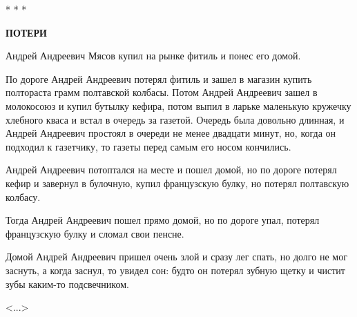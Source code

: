 \begin{center}
    * * *
\end{center}

\begin{center}
    \textbf{ПОТЕРИ}
\end{center}

    Андрей  Андреевич  Мясов купил на  рынке
фитиль и понес его домой.

    По дороге Андрей Андреевич  потерял  
фитиль  и  зашел  в  магазин купить полтораста
грамм полтавской колбасы. Потом Андрей  
Андреевич зашел  в  молокосоюз  и купил бутылку
кефира, потом выпил в ларьке  маленькую 
кружечку хлебного  кваса  и встал  в очередь за
газетой.  Очередь была довольно  длинная,  и
Андрей Андреевич простоял в очереди не менее
двадцати минут, но, когда он  подходил к 
газетчику,  то  газеты перед самым  его  носом
кончились.

    Андрей  Андреевич  потоптался на месте и
пошел домой,  но по дороге потерял  кефир  и
завернул в булочную, купил французскую  
булку, но потерял полтавскую колбасу.

    Тогда  Андрей Андреевич пошел прямо  
домой, но по дороге упал, потерял  французскую
булку и сломал свои пенсне.

    Домой Андрей Андреевич пришел очень злой
и сразу лег спать,  но долго не мог заснуть,
а когда заснул, то увидел сон: будто он  
потерял  зубную  щетку и чистит  зубы каким-то
подсвечником.

{\raggedleft
	\parbox{6cm}{\centering
		<...>
	}

}